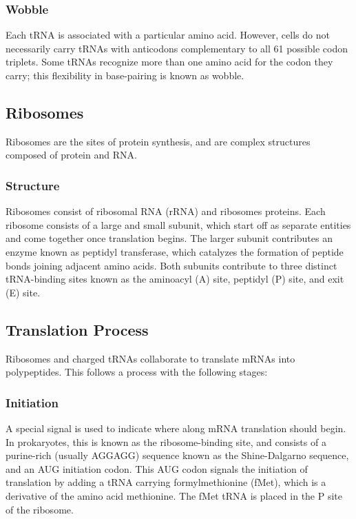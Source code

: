 \documentclass[12pt,titlepage]{article}
\begin{document}
      \subsubsection{Wobble}
        Each tRNA is associated with a particular amino acid. However, cells do not necessarily carry tRNAs with anticodons complementary to all 61 possible
        codon triplets. Some tRNAs recognize more than one amino acid for the codon they carry; this flexibility in base-pairing is known as wobble.

    \subsection{Ribosomes}
      Ribosomes are the sites of protein synthesis, and are complex structures composed of protein and RNA.

      \subsubsection{Structure}
        Ribosomes consist of ribosomal RNA (rRNA) and ribosomes proteins. Each ribosome consists of a large and small subunit, which start off as separate entities
        and come together once translation begins. The larger subunit contributes an enzyme known as peptidyl transferase, which catalyzes the formation of peptide
        bonds joining adjacent amino acids. Both subunits contribute to three distinct tRNA-binding sites known as the aminoacyl (A) site, peptidyl (P) site, and
        exit (E) site.

    \subsection{Translation Process}
      Ribosomes and charged tRNAs collaborate to translate mRNAs into polypeptides. This follows a process with the following stages:

      \subsubsection{Initiation}
        A special signal is used to indicate where along mRNA translation should begin. In prokaryotes, this is known as the ribosome-binding site, and consists of
        a purine-rich (usually AGGAGG) sequence known as the Shine-Dalgarno sequence, and an AUG initiation codon. This AUG codon signals the initiation of
        translation by adding a tRNA carrying formylmethionine (fMet), which is a derivative of the amino acid methionine. The fMet tRNA is placed in the P site of
        the ribosome.
\end{document}
